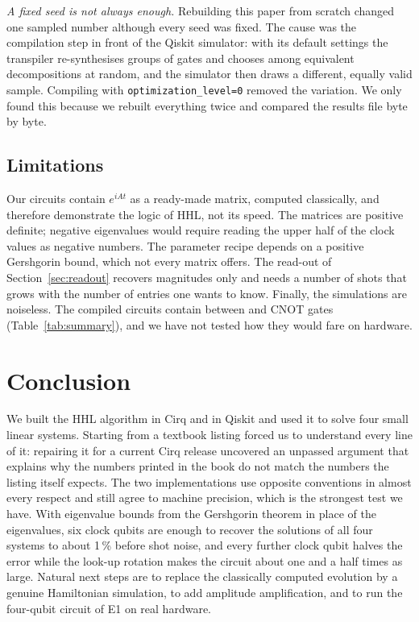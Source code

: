 \documentclass[manuscript,screen,review,nonacm]{acmart}
\newcommand{\code}[1]{\texttt{#1}}
\begin{document}
\emph{A fixed seed is not always enough.} Rebuilding this paper from scratch
changed one sampled number although every seed was fixed. The cause was the
compilation step in front of the Qiskit simulator: with its default settings
the transpiler re-synthesises groups of gates and chooses among equivalent
decompositions at random, and the simulator then draws a different, equally
valid sample. Compiling with \code{optimization\_level=0} removed the
variation. We only found this because we rebuilt everything twice and compared
the results file byte by byte.

\subsection{Limitations}

Our circuits contain $e^{iAt}$ as a ready-made matrix, computed classically,
and therefore demonstrate the logic of HHL, not its speed. The matrices are
positive definite; negative eigenvalues would require reading the upper half
of the clock values as negative numbers. The parameter recipe depends on a
positive Gershgorin bound, which not every matrix offers. The read-out of
Section~\ref{sec:readout} recovers magnitudes only and needs a number of shots
that grows with the number of entries one wants to know. Finally, the
simulations are noiseless. The compiled circuits contain between \EOneCx{} and
\EFourCx{} CNOT gates (Table~\ref{tab:summary}), and we have not tested how
they would fare on hardware.

\section{Conclusion}

We built the HHL algorithm in Cirq and in Qiskit and used it to solve four
small linear systems. Starting from a textbook listing forced us to understand
every line of it: repairing it for a current Cirq release uncovered an
unpassed argument that explains why the numbers printed in the book do not
match the numbers the listing itself expects. The two implementations use
opposite conventions in almost every respect and still agree to machine
precision, which is the strongest test we have. With eigenvalue bounds from
the Gershgorin theorem in place of the eigenvalues, six clock qubits are
enough to recover the solutions of all four systems to about 1\,\% before
shot noise, and every further clock qubit halves the error while the look-up
rotation makes the circuit about one and a half times as large. Natural next
steps are to replace the classically computed evolution by a genuine
Hamiltonian simulation, to add amplitude amplification, and to run the
four-qubit circuit of E1 on real hardware.
\end{document}
